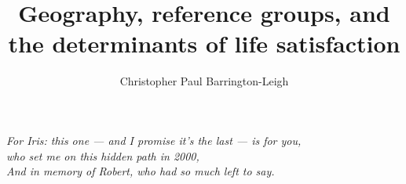 \documentclass[phd,oneside,11pt,norunningheaders]{ubcthesiscpbl}
\title{Geography, reference groups, and the determinants of life satisfaction}
\subtitle{}
\author{Christopher Paul Barrington-Leigh}
\newcommand{\ifdoDoubleSpace}[1]{}
\def\setpageforTOC{\setcounter{page}{2}}
\def\setpageforTOC{}
\def\dedication#1{
  \chapter[Dedication]{} %
  \thispagestyle{plain}   %
  \vspace{6cm}
  \begin{center}
    #1
  \end{center}
  }
\begin{document}

\ifdoDoubleSpace{ \begin{singlespace} }

\frontmatter

\maketitle
\newpage\thispagestyle{empty}\newpage  %


\newpage\thispagestyle{empty}\newpage  %
\setpageforTOC

\tableofcontents



\dedication{\Large \em
For Iris: this one --- and I promise it's the last --- is for you,\\
who set me on this hidden path in 2000,\\ \vspace{5mm}
And in memory of Robert, who had so much left to say.
}
		
\newpage				%
\thispagestyle{plain}		%
\mainmatter			%

\ifdoDoubleSpace{ \end{singlespace} }

     

	
\end{document}
